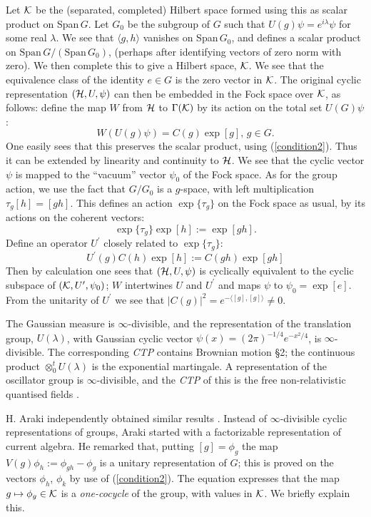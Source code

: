 Let ${\cal K}$ be the (separated, completed) Hilbert space formed using this
as scalar product on Span$\,G$. Let $G_0$ be the subgroup of $G$ such that
$U(g)\psi=e^{i\lambda}\psi$ for some real $\lambda$. We see that
$\langle g,h\rangle$ vanishes on Span$\,G_0$, and
defines a scalar product
on $\mbox{Span}\,G/(\mbox{Span}\,G_0)$, (perhaps after
identifying vectors of zero norm with zero).
We then complete this to give a Hilbert space, ${\cal K}$. We see that the
equivalence class of the identity $e\in G$ is the zero vector
in ${\cal K}$. The original
cyclic representation $({\cal H},U,\psi)$ can then be embedded in the Fock
space over ${\cal K}$, as follows: define the map $W$ from ${\cal H}$ to
$\Gamma({\cal K})$ by its action on the total set $U(G)\psi$:
\begin{equation}
W(U(g)\psi)=C(g)\exp[g],\,g\in G.
\end{equation}
One easily sees that this preserves the scalar product, using
(\ref{condition2}). Thus it can be extended by linearity and continuity
to ${\cal H}$. We see that the cyclic vector $\psi$ is mapped to the
``vacuum'' vector $\psi_0$ of the Fock space. As for the group
action, we use the fact that $G/G_0$ is a $g$-space, with left multiplication
$\tau_g[h]=[gh]$. This defines an action $\exp\{\tau_g\}$ on the Fock space
as usual, by its actions on the coherent vectors:
\[\exp\{\tau_g\}\exp[h]:=\exp[gh] .\]
Define an operator $U^\prime$ closely related to $\exp\{\tau_g\}$:
\begin{equation}
U^\prime(g)C(h)\exp[h]:=C(gh)\exp[gh]
\label{embed}
\end{equation}
Then by calculation one sees that $({\cal H},U,\psi)$ is cyclically
equivalent to the cyclic subspace of $({\cal K},U^\prime,\psi_0)$; $W$
intertwines $U$ and $U^\prime$ and maps $\psi$ to $\psi_0=\exp[e]$.
From the unitarity of $U^\prime$ we see that
$|C(g)|^2=e^{-\langle[g],[g]\rangle}\neq0$.

The Gaussian measure is $\infty$-divisible, and the representation
of the translation group, $U(\lambda)$,
with Gaussian cyclic vector $\psi(x)=(2\pi)^{-1/4}e^{-x^2/4}$, is
$\infty$-divisible. The corresponding {\em CTP} contains Brownian
motion  \S2; the continuous product $\otimes_0^tU(\lambda)$ is the
exponential martingale. A representation
of the oscillator group is $\infty$-divisible, and the {\em CTP}
of this is the free non-relativistic quantised fields \cite{RFS3}.

H. Araki independently obtained similar results \cite{Araki}. Instead of
$\infty$-divisible cyclic representations of groups, Araki started with
a factorizable representation of current algebra.
He remarked that, putting $[g]=\phi_g$
the map $V(g)\phi_h:=\phi_{gh}-\phi_g$ 
is a unitary representation of $G$; this is proved on the vectors
$\phi_h$, $\phi_k$ by use of (\ref{condition2}). The equation
expresses that the
map $g\mapsto \phi_g\in{\cal K}$ is a {\em one-cocycle} of the group, with
values in ${\cal K}$. We briefly explain this.

